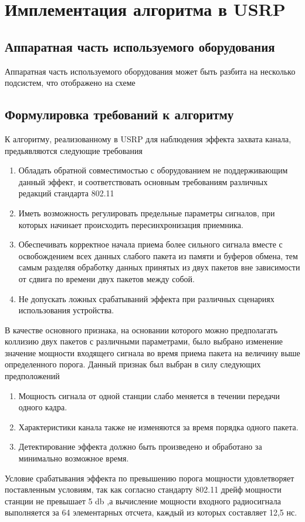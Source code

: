 \documentclass{llncs}
\begin{document}
\section{Имплементация алгоритма в USRP}
\subsection{Аппаратная часть используемого оборудования}
Аппаратная часть используемого оборудования может быть разбита %
на несколько подсистем, что отображено на схеме


\subsection{Формулировка требований к алгоритму}
К алгоритму, реализованному в USRP для наблюдения эффекта захвата канала,  предьявляются следующие требования
\begin{enumerate}
\item Обладать  обратной совместимостью с оборудованием не поддерживающим данный эффект, и соответствовать основным требованиям различных редакций стандарта 802.11
\item Иметь возможность регулировать предельные параметры  сигналов, при которых  начинает происходить пересинхронизация приемника. 
\item Обеспечивать корректное начала приема более сильного сигнала вместе с освобождением всех данных слабого пакета из памяти и буферов обмена, тем самым разделяя обработку данных принятых из двух пакетов вне зависимости от сдвига по времени двух пакетов между собой.
\item Не допускать ложных срабатываний эффекта при различных сценариях 
использования устройства.
 
\end{enumerate}  В качестве
основного признака, на основании которого можно предполагать коллизию двух пакетов с различными параметрами, было выбрано изменение значение мощности входящего сигнала во время приема пакета на величину выше определенного порога. Данный признак был выбран в силу следующих предположений \begin{enumerate}
\item Мощность сигнала от одной станции слабо меняется в течении передачи одного кадра. 
\item Характеристики канала также не изменяются за время порядка одного пакета. 
\item Детектирование эффекта должно быть произведено и обработано за минимально возможное время.

\end{enumerate} 
Условие срабатывания эффекта по превышению порога мощности удовлетворяет поставленным условиям, так как согласно стандарту 802.11 дрейф мощности станции не превышает 5 db ,а вычисление мощности входного радиосигнала выполняется за 64 элементарных отсчета, каждый из которых составляет 12,5 нс.
\\\
\end{document}
